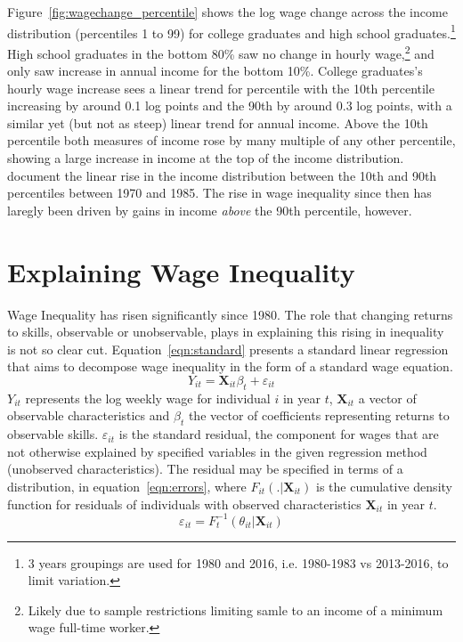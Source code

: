 \documentclass[notitlepage,12pt]{article}
\newcommand{\1}[1]{\ensuremath{\mathbb{1}\left( #1 \right)}}               %
\begin{document}
Figure~\ref{fig:wagechange_percentile} shows the log wage change across the income distribution (percentiles 1 to 99) for college graduates and high school graduates.\footnote{3 years groupings are used for 1980 and 2016, i.e. 1980-1983 vs 2013-2016, to limit variation.}  High school graduates in the bottom 80\% saw no change in hourly wage,\footnote{Likely due to sample restrictions limiting samle to an income of a minimum wage full-time worker.} and only saw increase in annual income for the bottom 10\%.  College graduates's hourly wage increase sees a linear trend for percentile with the 10th percentile increasing by around 0.1 log points and the 90th by around 0.3 log points, with a similar yet (but not as steep) linear trend for annual income.  Above the 10th percentile both measures of income rose by many multiple of any other percentile, showing a large increase in income at the top of the income distribution.  \cite{juhn1993wage} document the linear rise in the income distribution between the 10th and 90th percentiles between 1970 and 1985.  The rise in wage inequality since then has laregly been driven by gains in income \textit{above} the 90th percentile, however.

\section{Explaining Wage Inequality}
\label{explaininginequality}
Wage Inequality has risen significantly since 1980.  The role that changing returns to skills, observable or unobservable, plays in explaining this rising in inequality is not so clear cut.  Equation~\eqref{eqn:standard} presents a standard linear regression that aims to decompose wage inequality in the form of a standard wage equation. 
\begin{equation}
  \label{eqn:standard}
  Y_{it} = \mathbf{X}_{it}\beta_t + \varepsilon_{it}
\end{equation}
$Y_{it}$ represents the log weekly wage for individual $i$ in year $t$, $\mathbf{X}_{it}$ a vector of observable characteristics and $\beta_t$ the vector of coefficients representing returns to observable skills. $\varepsilon_{it}$ is the standard residual, the component for wages that are not otherwise explained by specified variables in the given regression method (unobserved characteristics).  The residual may be specified in terms of a distribution, in equation~\eqref{eqn:errors}, where $F_{it}(. | \mathbf{X}_{it})$ is the cumulative density function for residuals of individuals with observed characteristics $\mathbf{X}_{it}$ in year $t$.
\begin{equation}
  \label{eqn:errors}
  \varepsilon_{it} = F_{t}^{-1}(\theta_{it} | \mathbf{X}_{it})
\end{equation}
\end{document}
